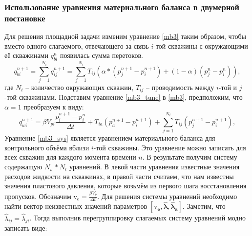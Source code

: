 \documentclass[14pt]{article}
\begin{document}
\subsubsection{Использование уравнения материального баланса в двумерной постановке}
Для решения площадной задачи изменим уравнение \ref{mb3} таким образом, чтобы вместо одного слагаемого, отвечающего за связь $i$-той скважины с окружающими её скважинами $q_{bi}^{n}$ появилась сумма перетоков.
\begin{equation}\label{mb3_tune}
	q_{bi}^{n+1} =  \sum_{j=1}^{N_i} q_{ij}^{n+1} = \sum_{j=1}^{N_i}T_{ij} \left(\alpha*\left(p_j^{n+1} - p_i^{n+1}\right) + \left(1-\alpha\right)\left(p_j^n - p_i^n\right)\right),
\end{equation}
где $N_i$ -- количество окружающих скважин, $T_{ij}$ -- проводимость между $i$-той и $j$-той скважинами. 
Подставим уравнение \ref{mb3_tune} в \ref{mb3}, предположим, что $\alpha = 1$ преобразуем к виду:
\begin{equation}\label{mb3_sys}
	q_{wi}^{n+1} =  \beta V_{pi}\frac{p_i^{n+1} - p_i^n}{\Delta t} + T_{ia} \left(p_a^{n+1} - p_i^{n+1}\right) +  \sum_{j=1}^{N_i}T_{ij} \left(p_j^{n+1} - p_i^{n+1}\right),
\end{equation}
Уравнение \ref{mb3_sys} является уравнением материального баланса для контрольного объёма вблизи $i$-той скважины. Это уравнение можно записать для всех скважин для каждого момента времени $n$. В результате получим систему содержащую $N_w * N_t$ уравнений. В левой части уравнения известные значения расходов жидкости на скважинах, в правой части считаем, что нам известны значения пластового давления, которые возьмём из первого шага восстановления пропусков. Обозначим $\mathrm{v}_e = \frac{\beta V_p}{\Delta t}$. Для решения системы уравнений необходимо найти вектор неизвестных значений параметров $[\boldsymbol{\mathrm{v}_e}, \boldsymbol{\hat{\lambda}}, \boldsymbol{\hat{\lambda}_a}]$. Заметим, что $\hat{\lambda}_{ij} = \hat{\lambda}_{ji}$. Тогда выполнив перегруппировку слагаемых систему уравнений модно записать виде:
\end{document}
